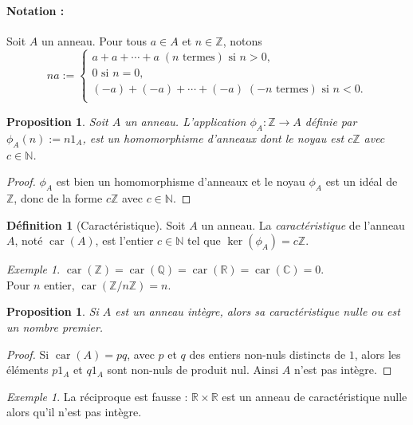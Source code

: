\documentclass[a4paper, titlepage]{article}
\newtheorem{prop}[theo]{Proposition}
\theoremstyle{definition}
\newtheorem{defi}[theo]{Définition}
\theoremstyle{remark}
\newtheorem{exem}[theo]{Exemple}
\def\N{\mathbb N}
\def\Z{\mathbb Z}
\def\Q{\mathbb Q}
\def\R{\mathbb R}
\def\C{\mathbb C}
\def\car{\operatorname{car}}
\begin{document}
\paragraph*{Notation :}
Soit $A$ un anneau. Pour tous $a \in A$ et $n \in \Z$, notons
$$na := \left\{\begin{array}{l}
a + a + \cdots + a \; (n \text{ termes}) \text{ si } n > 0,\\
0 \text{ si } n = 0,\\
(-a) + (-a) + \cdots + (-a)\; (-n \text{ termes}) \text{ si } n < 0.\\
\end{array}\right.$$

\begin{prop}
Soit $A$ un anneau. L'application $\phi_A : \Z \rightarrow A$ définie par $\phi_A(n) := n1_A$, est un homomorphisme d'anneaux dont le noyau est $c\Z$ avec $c\in \N$.
\end{prop}

\begin{proof}
$\phi_A$ est bien un homomorphisme d'anneaux et le noyau $\phi_A$ est un idéal de $\Z$, donc de la forme $c\Z$ avec $c\in\N$.
\end{proof}

\begin{defi}[Caractéristique]
Soit $A$ un anneau. La \textit{caractéristique} de l'anneau $A$, noté $\car(A)$, est l'entier $c\in\N$ tel que $\ker(\phi_A) = c\Z$.
\end{defi}

\begin{exem}
$\car(\Z) = \car(\Q) =\car(\R) =\car(\C) = 0$. \\
Pour $n$ entier, $\car(\Z/n\Z) = n$.
\end{exem}

\begin{prop}\label{caracIntegre}
Si $A$ est un anneau intègre, alors sa caractéristique nulle ou est un nombre premier.
\end{prop}

\begin{proof}
Si $\car(A) = pq$, avec $p$ et $q$ des entiers non-nuls distincts de $1$, alors les éléments $p1_A$ et $q1_A$ sont non-nuls de produit nul. Ainsi $A$ n'est pas intègre.
\end{proof}

\begin{exem}
La réciproque est fausse : $\R\times\R$ est un anneau de caractéristique nulle alors qu'il n'est pas intègre.
\end{exem}
\end{document}
